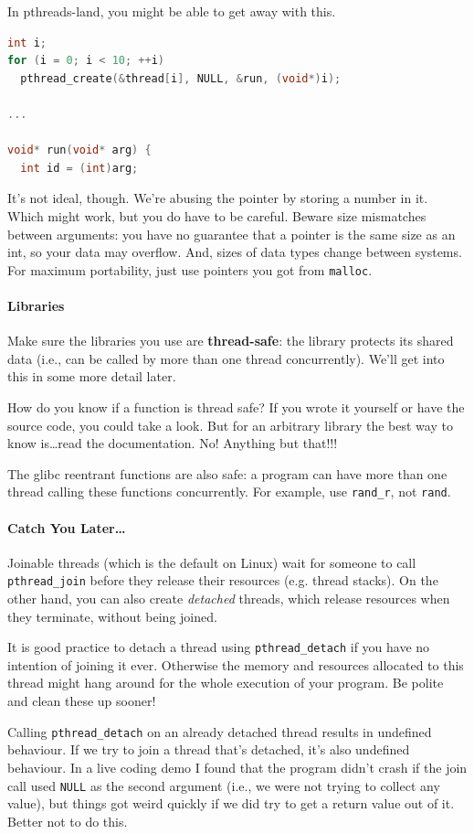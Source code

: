 \documentclass[a4paper]{report}
\begin{document}
In pthreads-land, you might be able to get away with this.
\begin{lstlisting}[language=C]
int i;
for (i = 0; i < 10; ++i)
  pthread_create(&thread[i], NULL, &run, (void*)i);

...

void* run(void* arg) {
  int id = (int)arg;
\end{lstlisting}
It's not ideal, though. We're abusing the pointer by storing a number in it. Which might work, but you do have to be careful. Beware size mismatches between arguments: you have no guarantee that a pointer is the same size as an int, so your data may overflow. And, sizes of data types change between systems. For maximum portability, just use pointers you got from {\tt malloc}.


\paragraph{Libraries} Make sure the libraries you use are {\bf thread-safe}: the library protects its shared data (i.e., can be called by more than one thread concurrently). We'll get into this in some more detail later.

How do you know if a function is thread safe? If you wrote it yourself or have the source code, you could take a look. But for an arbitrary library the best way to know is\ldots read the documentation. No! Anything but that!!!

The glibc reentrant functions are also safe: a program can have
      more than one thread calling these functions concurrently. For
      example, use {\tt rand\_r}, not {\tt rand}.


\paragraph{Catch You Later\ldots}Joinable threads
(which is the default on Linux) wait for someone to call {\tt pthread\_join}
before they release their resources (e.g. thread stacks). On the other
hand, you can also create \emph{detached} threads, which release
resources when they terminate, without being joined. 

It is good practice to detach a thread using \texttt{pthread\_detach} if you have no intention of joining it ever. Otherwise the memory and resources allocated to this thread might hang around for the whole execution of your program. Be polite and clean these up sooner! 

Calling {\tt pthread\_detach} on an already detached thread results in undefined behaviour. If we try to join a thread that's detached, it's also undefined behaviour. In a live coding demo I found that the program didn't crash if the join call used \texttt{NULL} as the second argument (i.e., we were not trying to collect any value), but things got weird quickly if we did try to get a return value out of it. Better not to do this.
\end{document}
